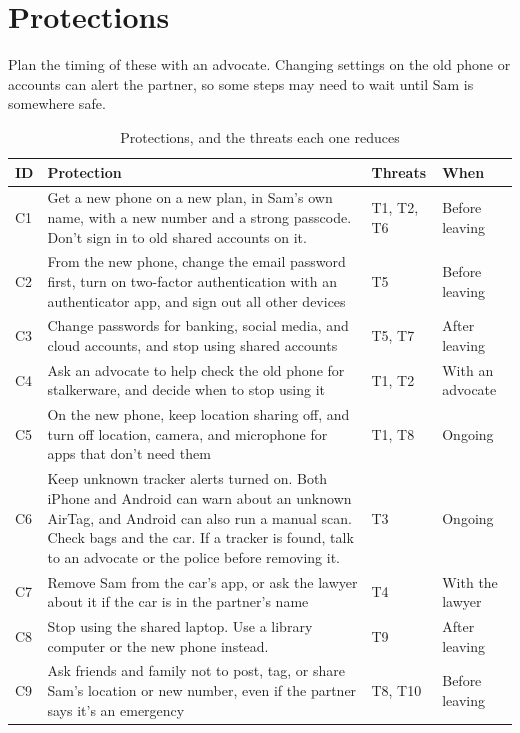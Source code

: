 \documentclass[11pt]{article}
\begin{document}
\section{Protections}
Plan the timing of these with an advocate. Changing settings on the old phone or accounts can alert the partner, so some steps may need to wait until Sam is somewhere safe.
\begin{table}[H]
\caption{Protections, and the threats each one reduces}
\begin{tabular}{|m{}|m{}|m{}|m{}|}
\hline
\textbf{ID} & \textbf{Protection} & \textbf{Threats} & \textbf{When} \\
\hline
C1 & Get a new phone on a new plan, in Sam's own name, with a new number and a strong passcode. Don't sign in to old shared accounts on it. & T1, T2, T6 & Before leaving \\
\hline
C2 & From the new phone, change the email password first, turn on two-factor authentication with an authenticator app, and sign out all other devices & T5 & Before leaving \\
\hline
C3 & Change passwords for banking, social media, and cloud accounts, and stop using shared accounts & T5, T7 & After leaving \\
\hline
C4 & Ask an advocate to help check the old phone for stalkerware, and decide when to stop using it & T1, T2 & With an advocate \\
\hline
C5 & On the new phone, keep location sharing off, and turn off location, camera, and microphone for apps that don't need them & T1, T8 & Ongoing \\
\hline
C6 & Keep unknown tracker alerts turned on. Both iPhone and Android can warn about an unknown AirTag, and Android can also run a manual scan. Check bags and the car. If a tracker is found, talk to an advocate or the police before removing it. & T3 & Ongoing \\
\hline
C7 & Remove Sam from the car's app, or ask the lawyer about it if the car is in the partner's name & T4 & With the lawyer \\
\hline
C8 & Stop using the shared laptop. Use a library computer or the new phone instead. & T9 & After leaving \\
\hline
C9 & Ask friends and family not to post, tag, or share Sam's location or new number, even if the partner says it's an emergency & T8, T10 & Before leaving
\end{tabular}
\end{table}
\end{document}
